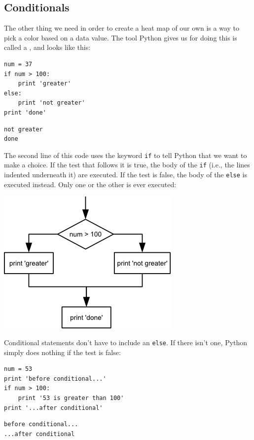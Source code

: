 \documentclass{book}
\begin{document}
\subsection{Conditionals}

The other thing we need in order to create a heat map of our own is a
way to pick a color based on a data value. The tool Python gives us for
doing this is called a , and looks like this:

\begin{verbatim}
num = 37
if num > 100:
    print 'greater'
else:
    print 'not greater'
print 'done'
\end{verbatim}

\begin{verbatim}
not greater
done
\end{verbatim}

The second line of this code uses the keyword \texttt{if} to tell Python
that we want to make a choice. If the test that follows it is true, the
body of the \texttt{if} (i.e., the lines indented underneath it) are
executed. If the test is false, the body of the \texttt{else} is
executed instead. Only one or the other is ever executed:

\includegraphics{novice/python/img/python-flowchart-conditional.png}

Conditional statements don't have to include an \texttt{else}. If there
isn't one, Python simply does nothing if the test is false:

\begin{verbatim}
num = 53
print 'before conditional...'
if num > 100:
    print '53 is greater than 100'
print '...after conditional'
\end{verbatim}

\begin{verbatim}
before conditional...
...after conditional
\end{verbatim}
\end{document}
